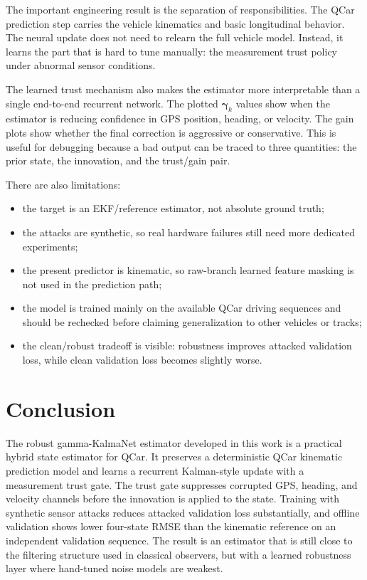 \documentclass[11pt,a4paper]{article}
\newcommand{\trust}{\bm{\gamma}}
\begin{document}
The important engineering result is the separation of responsibilities.
The QCar prediction step carries the vehicle kinematics and basic longitudinal
behavior. The neural update does not need to relearn the full vehicle model.
Instead, it learns the part that is hard to tune manually: the measurement
trust policy under abnormal sensor conditions.

The learned trust mechanism also makes the estimator more interpretable than a
single end-to-end recurrent network. The plotted $\trust_k$ values show when
the estimator is reducing confidence in GPS position, heading, or velocity.
The gain plots show whether the final correction is aggressive or conservative.
This is useful for debugging because a bad output can be traced to three
quantities: the prior state, the innovation, and the trust/gain pair.

There are also limitations:
\begin{itemize}
  \item the target is an EKF/reference estimator, not absolute ground truth;
  \item the attacks are synthetic, so real hardware failures still need more
  dedicated experiments;
  \item the present predictor is kinematic, so raw-branch learned feature
  masking is not used in the prediction path;
  \item the model is trained mainly on the available QCar driving sequences and
  should be rechecked before claiming generalization to other vehicles or
  tracks;
  \item the clean/robust tradeoff is visible: robustness improves attacked
  validation loss, while clean validation loss becomes slightly worse.
\end{itemize}

\section{Conclusion}

The robust gamma-KalmaNet estimator developed in this work is a practical
hybrid state estimator for QCar. It preserves a deterministic QCar kinematic
prediction model and learns a recurrent Kalman-style update with a measurement
trust gate. The trust gate suppresses corrupted GPS, heading, and velocity
channels before the innovation is applied to the state. Training with synthetic
sensor attacks reduces attacked validation loss substantially, and offline
validation shows lower four-state RMSE than the kinematic reference on an
independent validation sequence. The result is an estimator that is still close
to the filtering structure used in classical observers, but with a learned
robustness layer where hand-tuned noise models are weakest.
\end{document}
